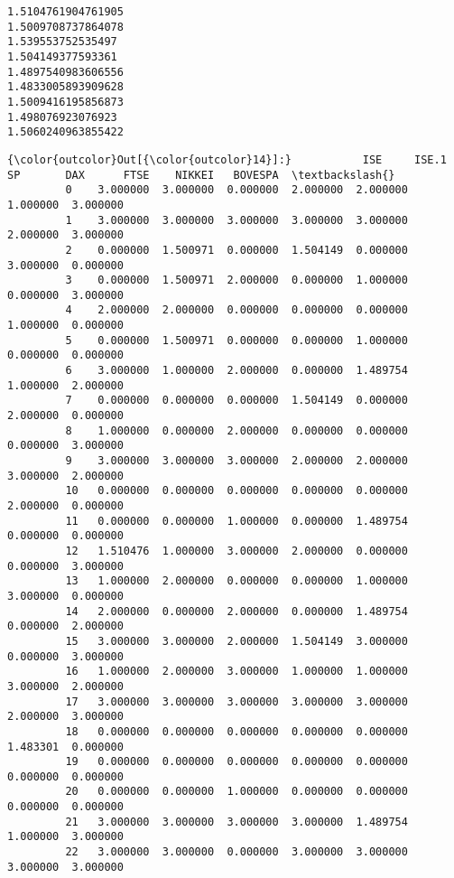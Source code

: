 \documentclass[11pt]{article}
\begin{document}
    \begin{Verbatim}[commandchars=\\\{\}]
1.5104761904761905
1.5009708737864078
1.539553752535497
1.504149377593361
1.4897540983606556
1.4833005893909628
1.5009416195856873
1.498076923076923
1.5060240963855422

    \end{Verbatim}

\begin{Verbatim}[commandchars=\\\{\}]
{\color{outcolor}Out[{\color{outcolor}14}]:}           ISE     ISE.1        SP       DAX      FTSE    NIKKEI   BOVESPA  \textbackslash{}
         0    3.000000  3.000000  0.000000  2.000000  2.000000  1.000000  3.000000   
         1    3.000000  3.000000  3.000000  3.000000  3.000000  2.000000  3.000000   
         2    0.000000  1.500971  0.000000  1.504149  0.000000  3.000000  0.000000   
         3    0.000000  1.500971  2.000000  0.000000  1.000000  0.000000  3.000000   
         4    2.000000  2.000000  0.000000  0.000000  0.000000  1.000000  0.000000   
         5    0.000000  1.500971  0.000000  0.000000  1.000000  0.000000  0.000000   
         6    3.000000  1.000000  2.000000  0.000000  1.489754  1.000000  2.000000   
         7    0.000000  0.000000  0.000000  1.504149  0.000000  2.000000  0.000000   
         8    1.000000  0.000000  2.000000  0.000000  0.000000  0.000000  3.000000   
         9    3.000000  3.000000  3.000000  2.000000  2.000000  3.000000  2.000000   
         10   0.000000  0.000000  0.000000  0.000000  0.000000  2.000000  0.000000   
         11   0.000000  0.000000  1.000000  0.000000  1.489754  0.000000  0.000000   
         12   1.510476  1.000000  3.000000  2.000000  0.000000  0.000000  3.000000   
         13   1.000000  2.000000  0.000000  0.000000  1.000000  3.000000  0.000000   
         14   2.000000  0.000000  2.000000  0.000000  1.489754  0.000000  2.000000   
         15   3.000000  3.000000  2.000000  1.504149  3.000000  0.000000  3.000000   
         16   1.000000  2.000000  3.000000  1.000000  1.000000  3.000000  2.000000   
         17   3.000000  3.000000  3.000000  3.000000  3.000000  2.000000  3.000000   
         18   0.000000  0.000000  0.000000  0.000000  0.000000  1.483301  0.000000   
         19   0.000000  0.000000  0.000000  0.000000  0.000000  0.000000  0.000000   
         20   0.000000  0.000000  1.000000  0.000000  0.000000  0.000000  0.000000   
         21   3.000000  3.000000  3.000000  3.000000  1.489754  1.000000  3.000000   
         22   3.000000  3.000000  0.000000  3.000000  3.000000  3.000000  3.000000   

\end{Verbatim}
\end{document}
